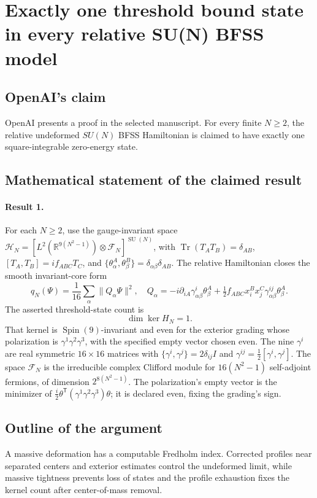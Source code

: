 \documentclass[11pt]{article}
\begin{document}
\section*{Exactly one threshold bound state in every relative SU(N) BFSS model}

\subsection{OpenAI's claim}
OpenAI presents a proof in the selected manuscript. For every finite $N\geq2$, the relative undeformed $SU(N)$ BFSS Hamiltonian is claimed to have exactly one square-integrable zero-energy state.

\subsection{Mathematical statement of the claimed result}
\paragraph{Result 1.} For each \(N\ge2\), use the gauge-invariant space \(\mathcal H_N=[L^2(\mathbb R^{9(N^2-1)})\otimes\mathcal F_N]^{\operatorname{SU}(N)}\), with \(\operatorname{Tr}(T_AT_B)=\delta_{AB}\), \([T_A,T_B]=if_{ABC}T_C\), and \(\{\theta_\alpha^A,\theta_\beta^B\}=\delta_{\alpha\beta}\delta_{AB}\). The relative Hamiltonian closes the smooth invariant-core form
\[
 q_N(\Psi)=\frac1{16}\sum_\alpha\|Q_\alpha\Psi\|^2,\quad
 Q_\alpha=-i\partial_{iA}\gamma^i_{\alpha\beta}\theta_\beta^A
 +\tfrac12 f_{ABC}x_i^Bx_j^C\gamma^{ij}_{\alpha\beta}\theta_\beta^A.
\]
The asserted threshold-state count is
\[
 \dim\ker H_N=1.
\]
That kernel is \(\operatorname{Spin}(9)\)-invariant and even for the exterior grading whose polarization is \(\gamma^1\gamma^2\gamma^3\), with the specified empty vector chosen even. The nine $\gamma^i$ are real symmetric $16\times16$ matrices with $\{\gamma^i,\gamma^j\}=2\delta_{ij}I$ and $\gamma^{ij}=\tfrac12[\gamma^i,\gamma^j]$. The space $\mathcal F_N$ is the irreducible complex Clifford module for $16(N^2-1)$ self-adjoint fermions, of dimension $2^{8(N^2-1)}$. The polarization's empty vector is the minimizer of $\tfrac i2\theta^{\mathsf T}(\gamma^1\gamma^2\gamma^3)\theta$; it is declared even, fixing the grading's sign.

\subsection{Outline of the argument}
A massive deformation has a computable Fredholm index. Corrected profiles near separated centers and exterior estimates control the undeformed limit, while massive tightness prevents loss of states and the profile exhaustion fixes the kernel count after center-of-mass removal.
\end{document}
